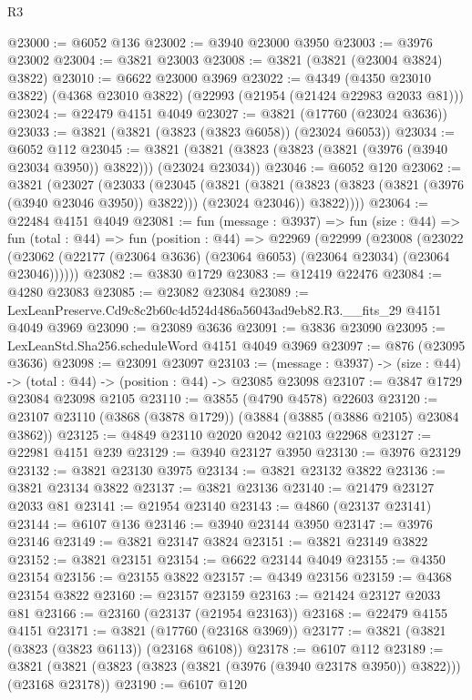 \begin{lexlean}{R3}
\begin{coremodule}
@23000 := @6052 @136
@23002 := @3940 @23000 @3950
@23003 := @3976 @23002
@23004 := @3821 @23003
@23008 := @3821 (@3821 (@23004 @3824) @3822)
@23010 := @6622 @23000 @3969
@23022 := @4349
    (@4350 @23010 @3822)
    (@4368 @23010 @3822)
    (@22993 (@21954 (@21424 @22983 @2033 @81)))
@23024 := @22479 @4151 @4049
@23027 := @3821 (@17760 (@23024 @3636))
@23033 := @3821 (@3821 (@3823 (@3823 @6058)) (@23024 @6053))
@23034 := @6052 @112
@23045 := @3821 (@3821 (@3823 (@3823 (@3821 (@3976 (@3940 @23034 @3950)) @3822))) (@23024 @23034))
@23046 := @6052 @120
@23062 := @3821
    (@23027
      (@23033
        (@23045
          (@3821
            (@3821 (@3823 (@3823 (@3821 (@3976 (@3940 @23046 @3950)) @3822))) (@23024 @23046))
            @3822))))
@23064 := @22484 @4151 @4049
@23081 := fun (message : @3937) =>
  fun (size : @44) =>
  fun (total : @44) =>
  fun (position : @44) =>
  @22969
    (@22999
      (@23008
        (@23022 (@23062 (@22177 (@23064 @3636) (@23064 @6053) (@23064 @23034) (@23064 @23046))))))
@23082 := @3830 @1729
@23083 := @12419 @22476
@23084 := @4280 @23083
@23085 := @23082 @23084
@23089 := LexLeanPreserve.Cd9c8c2b60c4d524d486a56043ad9eb82.R3.__fits_29 @4151 @4049 @3969
@23090 := @23089 @3636
@23091 := @3836 @23090
@23095 := LexLeanStd.Sha256.scheduleWord @4151 @4049 @3969
@23097 := @876 (@23095 @3636)
@23098 := @23091 @23097
@23103 := (message : @3937) -> (size : @44) -> (total : @44) -> (position : @44) -> @23085 @23098
@23107 := @3847 @1729 @23084 @23098 @2105
@23110 := @3855 (@4790 @4578) @22603
@23120 := @23107 @23110 (@3868 (@3878 @1729)) (@3884 (@3885 (@3886 @2105) @23084 @3862))
@23125 := @4849 @23110 @2020 @2042 @2103 @22968
@23127 := @22981 @4151 @239
@23129 := @3940 @23127 @3950
@23130 := @3976 @23129
@23132 := @3821 @23130 @3975
@23134 := @3821 @23132 @3822
@23136 := @3821 @23134 @3822
@23137 := @3821 @23136
@23140 := @21479 @23127 @2033 @81
@23141 := @21954 @23140
@23143 := @4860 (@23137 @23141)
@23144 := @6107 @136
@23146 := @3940 @23144 @3950
@23147 := @3976 @23146
@23149 := @3821 @23147 @3824
@23151 := @3821 @23149 @3822
@23152 := @3821 @23151
@23154 := @6622 @23144 @4049
@23155 := @4350 @23154
@23156 := @23155 @3822
@23157 := @4349 @23156
@23159 := @4368 @23154 @3822
@23160 := @23157 @23159
@23163 := @21424 @23127 @2033 @81
@23166 := @23160 (@23137 (@21954 @23163))
@23168 := @22479 @4155 @4151
@23171 := @3821 (@17760 (@23168 @3969))
@23177 := @3821 (@3821 (@3823 (@3823 @6113)) (@23168 @6108))
@23178 := @6107 @112
@23189 := @3821 (@3821 (@3823 (@3823 (@3821 (@3976 (@3940 @23178 @3950)) @3822))) (@23168 @23178))
@23190 := @6107 @120

\end{coremodule}
\end{lexlean}
